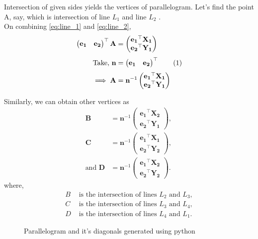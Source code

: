 \documentclass[journal,12pt,twocolumn]{IEEEtran}
\let\vec\mathbf
\newcommand{\myvec}[1]{\ensuremath{\begin{pmatrix}#1\end{pmatrix}}}
\newcommand\numberthis{\addtocounter{equation}{1}\tag{\theequation}}
\begin{document}
Intersection of given sides yields the vertices of parallelogram. Let's find the point A, say, which is intersection of line $L_1$  and line $L_2$ .\\ %
On combining \eqref{eq:line_1} and \eqref{eq:line_2}, 
\begin{align*}
		\myvec{ \vec{e_1} & \vec{e_2}}^{\top}\vec{A}&= \myvec{\vec{e_1}^{\top}\vec{X_1}\\ \vec{e_2}^{\top}\vec{Y_1} }  \\[0.7ex]
		\text{Take,	} \vec{n} &= \myvec{ \vec{e_1} & \vec{e_2}}^{\top} \numberthis \label{eq:n_matrix} \\[0.7ex]
		\implies \vec{A} &= \vec{n}^{-1} \myvec{\vec{e_1}^{\top}\vec{X_1}\\ \vec{e_2}^{\top}\vec{Y_1} }
\end{align*}

Similarly, we can obtain other vertices as
\begin{align*}
	\vec{B} &= \vec{n}^{-1} \myvec{\vec{e_1}^{\top}\vec{X_2}\\ \vec{e_2}^{\top}\vec{Y_1} } \text{, } \\[0.7ex]
	\vec{C} &= \vec{n}^{-1} \myvec{\vec{e_1}^{\top}\vec{X_1}\\ \vec{e_2}^{\top}\vec{Y_2} } \text{,}\\[0.7ex]
		\text{and  }		\vec{D} &= \vec{n}^{-1} \myvec{\vec{e_1}^{\top}\vec{X_2}\\ \vec{e_2}^{\top}\vec{Y_2} } \text{.}
\end{align*}
where,
\begin{align*}
	B & \text{ is the intersection of lines } L_2 \text{ and } L_3, \\[-0.5ex]
	C & \text{ is the intersection of lines } L_3 \text{ and }L_4,\\[-0.5ex]
	D & \text{ is the intersection of lines } L_4 \text{ and }L_1.
\end{align*}
\begin{figure}[h]
\centering
\def\figwidth{\linewidth}
\def\figheight{0.25\textheight} %

\caption{Parallelogram and it's diagonals generated using python}
\end{figure}
\end{document}
